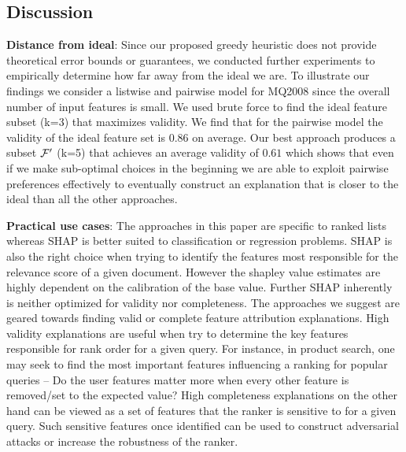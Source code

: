 \subsection{Discussion}
\textbf{Distance from ideal}: Since our proposed greedy heuristic does not provide theoretical error bounds or guarantees, we conducted further experiments to empirically determine how far away from the ideal we are. To illustrate our findings we consider a listwise and pairwise model for \textsc{MQ2008} since the overall number of input features is small. We used brute force to find the ideal feature subset (k=3) that maximizes validity. We find that for the pairwise model the validity of the ideal feature set is $0.86$ on average. Our best approach produces a subset $\mathcal{F}'$ (k=5) that achieves an average validity of $0.61$ which shows that even if we make sub-optimal choices in the beginning we are able to exploit pairwise preferences effectively to eventually construct an explanation that is closer to the ideal than all the other approaches. 

\textbf{Practical use cases}: The approaches in this paper are specific to ranked lists whereas \textsc{SHAP} is better suited to classification or regression problems. \textsc{SHAP} is also the right choice when trying to identify the features most responsible for the relevance score of a given document. However the shapley value estimates are highly dependent on the calibration of the base value. Further \textsc{SHAP} inherently is neither optimized for validity nor completeness. The approaches we suggest are geared towards finding valid or complete feature attribution explanations. High validity explanations are useful when try to determine the key features responsible for rank order for a given query. For instance, in product search, one may seek to find the most important features influencing a ranking for popular queries -- Do the user features matter more when every other feature is removed/set to the expected value? High completeness explanations on the other hand can be viewed as a set of features that the ranker is sensitive to for a given query. Such sensitive features once identified can be used to construct adversarial attacks or increase the robustness of the ranker.

